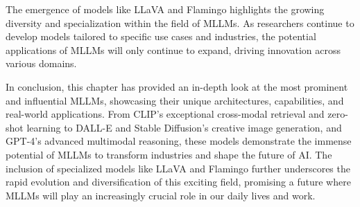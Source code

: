The emergence of models like LLaVA and Flamingo highlights the growing diversity and specialization within the field of MLLMs. As researchers continue to develop models tailored to specific use cases and industries, the potential applications of MLLMs will only continue to expand, driving innovation across various domains.

In conclusion, this chapter has provided an in-depth look at the most prominent and influential MLLMs, showcasing their unique architectures, capabilities, and real-world applications. From CLIP's exceptional cross-modal retrieval and zero-shot learning to DALL-E and Stable Diffusion's creative image generation, and GPT-4's advanced multimodal reasoning, these models demonstrate the immense potential of MLLMs to transform industries and shape the future of AI. The inclusion of specialized models like LLaVA and Flamingo further underscores the rapid evolution and diversification of this exciting field, promising a future where MLLMs will play an increasingly crucial role in our daily lives and work.

